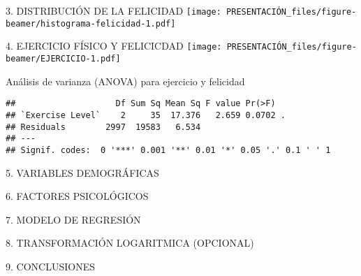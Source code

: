 \documentclass[
  ignorenonframetext,
]{beamer}
\begin{document}
\begin{frame}{3. DISTRIBUCIÓN DE LA FELICIDAD}
\label{distribuciuxf3n-de-la-felicidad}
\texttt{[image: PRESENTACIÓN\_files/figure-beamer/histograma-felicidad-1.pdf]}
\end{frame}

\begin{frame}{4. EJERCICIO FÍSICO Y FELICICDAD}
\label{ejercicio-fuxedsico-y-felicicdad}
\texttt{[image: PRESENTACIÓN\_files/figure-beamer/EJERCICIO-1.pdf]}
\end{frame}

\begin{frame}[fragile]
\begin{block}{Análisis de varianza (ANOVA) para ejercicio y felicidad}
\label{anuxe1lisis-de-varianza-anova-para-ejercicio-y-felicidad}
\begin{verbatim}
##                    Df Sum Sq Mean Sq F value Pr(>F)  
## `Exercise Level`    2     35  17.376   2.659 0.0702 .
## Residuals        2997  19583   6.534                 
## ---
## Signif. codes:  0 '***' 0.001 '**' 0.01 '*' 0.05 '.' 0.1 ' ' 1
\end{verbatim}
\end{block}
\end{frame}

\begin{frame}{5. VARIABLES DEMOGRÁFICAS}
\label{variables-demogruxe1ficas}
\end{frame}

\begin{frame}{6. FACTORES PSICOLÓGICOS}
\label{factores-psicoluxf3gicos}
\end{frame}

\begin{frame}{7. MODELO DE REGRESIÓN}
\label{modelo-de-regresiuxf3n}
\end{frame}

\begin{frame}{8. TRANSFORMACIÓN LOGARITMICA (OPCIONAL)}
\label{transformaciuxf3n-logaritmica-opcional}
\end{frame}

\begin{frame}{9. CONCLUSIONES}
\label{conclusiones}
\end{frame}
\end{document}
